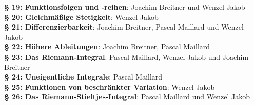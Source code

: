 \documentclass[a4paper,twoside,DIV15,BCOR12mm]{scrbook}
\begin{document}
\textbf{§ 19: Funktionsfolgen und -reihen}: Joachim Breitner und Wenzel Jakob\\
\textbf{§ 20: Gleichmäßige Stetigkeit}: Wenzel Jakob\\
\textbf{§ 21: Differenzierbarkeit}: Joachim Breitner, Pascal Maillard und Wenzel Jakob\\
\textbf{§ 22: Höhere Ableitungen}: Joachim Breitner, Pascal Maillard\\
\textbf{§ 23: Das Riemann-Integral}: Pascal Maillard, Wenzel Jakob und Joachim Breitner\\
\textbf{§ 24: Uneigentliche Integrale}: Pascal Maillard\\
\textbf{§ 25: Funktionen von beschränkter Variation}: Wenzel Jakob\\
\textbf{§ 26: Das Riemann-Stieltjes-Integral}: Pascal Maillard und Wenzel Jakob\\
\end{document}
